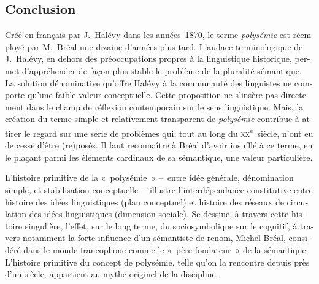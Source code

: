 \documentclass[output=paper]{langsci/langscibook}
\begin{document}
\begin{otherlanguage}{french}
\section{Conclusion}

Créé en français par J.~Halévy dans les années~1870, le terme \textit{polysémie} est réemployé par M.~Bréal une dizaine d’années plus tard. L’audace terminologique de J.~Halévy, en dehors des préoccupations propres à la linguistique historique, permet d’appréhender de façon plus stable le problème de la pluralité sémantique. La solution dénominative qu’offre Halévy à la communauté des linguistes ne comporte qu’une faible valeur conceptuelle. Cette proposition ne s’insère pas directement dans le champ de réflexion contemporain sur le sens linguistique. Mais, la création du terme simple et relativement transparent de \textit{polysémie} contribue à attirer le regard sur une série de problèmes qui, tout au long du \textsc{xx}\textsuperscript{e}~siècle, n’ont eu de cesse d’être (re)posés. Il faut reconnaître à Bréal d’avoir insufflé à ce terme, en le plaçant parmi les éléments cardinaux de sa sémantique, une valeur particulière.

L’histoire primitive de la «~polysémie~» –~entre idée générale, dénomination simple, et stabilisation conceptuelle~– illustre l’interdépendance constitutive entre histoire des idées linguistiques (plan conceptuel) et histoire des réseaux de circulation des idées linguistiques (dimension sociale). Se dessine, à travers cette histoire singulière, l’effet, sur le long terme, du sociosymbolique sur le cognitif, à travers notamment la forte influence d’un sémantiste de renom, Michel Bréal, considéré dans le monde francophone comme le «~père fondateur~» de la sémantique. L’histoire primitive du concept de polysémie, telle qu’on la rencontre depuis près d’un siècle, appartient au mythe originel de la discipline.


\end{otherlanguage}
\end{document}
